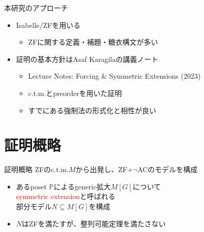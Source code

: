 \documentclass[17pt,aspectratio=169]{beamer}
\begin{document}
\begin{frame}{本研究のアプローチ}
    \vspace{10pt}

    \begin{itemize}
        \item Isabelle/ZFを用いる
              {\small \begin{itemize}
                  \item ZFに関する定義・補題・糖衣構文が多い


              \end{itemize}}
        \item 証明の基本方針はAsaf Karagilaの講義ノート
              {\small \begin{itemize}
                  \item Lecture Notes: Forcing \& Symmetric Extensions (2023)
                  \item c.t.m.とpreorderを用いた証明
                  \item すでにある強制法の形式化と相性が良い
              \end{itemize} }

    \end{itemize}
\end{frame}

\section{証明概略}
\begin{frame}{証明概略}
    ZFのc.t.m.$M$から出発し、ZF+$\neg$ACのモデルを構成
    \begin{itemize}
        \item あるposet $\mathbb{P}$によるgeneric拡大$M[G]$について\\
              \textcolor{red}{symmetric extension}と呼ばれる\\
              部分モデル$N \subseteq M[G]$を構成
        \item $N$はZFを満たすが、整列可能定理を満たさない
    \end{itemize}
\end{frame}
\end{document}
